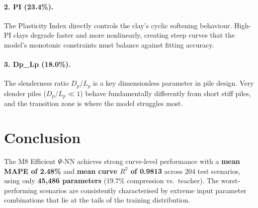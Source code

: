 \documentclass[11pt,a4paper]{article}
\begin{document}
\paragraph{2. PI (23.4\%).}
The Plasticity Index directly controls the clay's cyclic softening behaviour. High-PI clays degrade faster and more nonlinearly, creating steep curves that the model's monotonic constraints must balance against fitting accuracy.

\paragraph{3. Dp_Lp (18.0\%).}
The slenderness ratio $D_p/L_p$ is a key dimensionless parameter in pile design.  Very slender piles ($D_p/L_p \ll 1$) behave fundamentally differently from short stiff piles, and the transition zone is where the model struggles most.


\section{Conclusion}

The M8 Efficient $\Psi$-NN achieves strong curve-level performance with a
\textbf{mean MAPE of 2.48\%} and
\textbf{mean curve $R^2$ of 0.9813} across
204 test scenarios, using only \textbf{45,486 parameters}
(19.7\% compression vs.\ teacher).  The worst-performing scenarios are
consistently characterised by extreme input parameter combinations that lie
at the tails of the training distribution.
\end{document}
